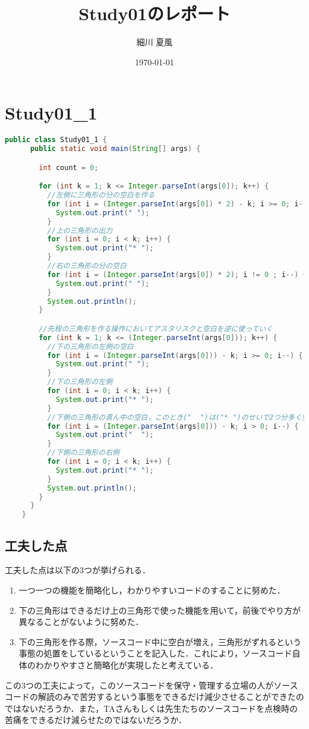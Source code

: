 \documentclass{jlreq}
\title{Study01のレポート}
\author{細川 夏風}
\date{\today}
\begin{document}
 \maketitle

  \section*{Study01\_1}
  \begin{lstlisting}[caption=Study01\_1.javaのソースコード, label=code:in, language=java]
    public class Study01_1 {
      public static void main(String[] args) {

        int count = 0;

        for (int k = 1; k <= Integer.parseInt(args[0]); k++) {
          //左側に三角形の分の空白を作る
          for (int i = (Integer.parseInt(args[0]) * 2) - k; i >= 0; i--) {
            System.out.print(" ");
          }
          //上の三角形の出力
          for (int i = 0; i < k; i++) {
            System.out.print("* ");
          }
          //右の三角形の分の空白
          for (int i = (Integer.parseInt(args[0]) * 2); i != 0 ; i--) {
            System.out.print(" ");
          }
          System.out.println();
        }

        //先程の三角形を作る操作においてアスタリスクと空白を逆に使っていく
        for (int k = 1; k <= (Integer.parseInt(args[0])); k++) {
          //下の三角形の左側の空白
          for (int i = (Integer.parseInt(args[0])) - k; i >= 0; i--) {
            System.out.print(" ");
          }
          //下の三角形の左側
          for (int i = 0; i < k; i++) {
            System.out.print("* ");
          }
          //下側の三角形の真ん中の空白，このとき("  ")は("* ")のせいで2つ分多く空白を出力してしまう．だから最後は表示しないという処理を行う．
          for (int i = (Integer.parseInt(args[0])) - k; i > 0; i--) {
            System.out.print("  "); 
          }
          //下側の三角形の右側
          for (int i = 0; i < k; i++) {
            System.out.print("* ");
          }
          System.out.println();
        }
      }
    }
  \end{lstlisting}
  \subsection*{工夫した点}
  工夫した点は以下の3つが挙げられる．
  \begin{enumerate}[(1.) ]
    \item 一つ一つの機能を簡略化し，わかりやすいコードのすることに努めた．
    \item 下の三角形はできるだけ上の三角形で使った機能を用いて，前後でやり方が異なることがないように努めた．
    \item 下の三角形を作る際，ソースコード中に空白が増え，三角形がずれるという事態の処置をしているということを記入した．これにより，ソースコード自体のわかりやすさと簡略化が実現したと考えている．
  \end{enumerate}
  この3つの工夫によって，このソースコードを保守・管理する立場の人がソースコードの解読のみで苦労するという事態をできるだけ減少させることができたのではないだろうか．また，TAさんもしくは先生たちのソースコードを点検時の苦痛をできるだけ減らせたのではないだろうか．
\end{document}
